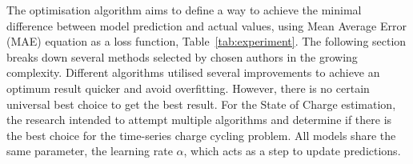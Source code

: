 The optimisation algorithm aims to define a way to achieve the minimal difference between model prediction and actual values, using Mean Average Error (MAE) equation as a loss function, \mbox{Table~\ref{tab:experiment}}.
The following section breaks down several methods selected by chosen authors in the growing complexity.
Different algorithms utilised several improvements to achieve an optimum result quicker and avoid overfitting.
However, there is no certain universal best choice to get the best result.
For the State of Charge estimation, the research intended to attempt multiple algorithms and determine if there is the best choice for the time-series charge cycling problem.
All models share the same parameter, the learning rate $\alpha$, which acts as a step to update predictions.

